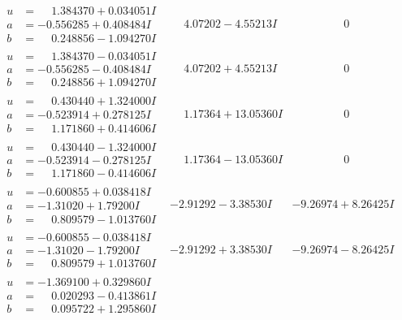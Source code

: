 \documentclass[1p]{elsarticle_modified}
\theoremstyle{definition}
\begin{document}
$$\begin{array}{c|c|c}
\begin{aligned}
u &= \phantom{-}1.384370 + 0.034051 I \\
a &= -0.556285 + 0.408484 I \\
b &= \phantom{-}0.248856 - 1.094270 I\end{aligned}
 & \phantom{-}4.07202 - 4.55213 I & \phantom{-0.000000 } 0 \\ \hline\begin{aligned}
u &= \phantom{-}1.384370 - 0.034051 I \\
a &= -0.556285 - 0.408484 I \\
b &= \phantom{-}0.248856 + 1.094270 I\end{aligned}
 & \phantom{-}4.07202 + 4.55213 I & \phantom{-0.000000 } 0 \\ \hline\begin{aligned}
u &= \phantom{-}0.430440 + 1.324000 I \\
a &= -0.523914 + 0.278125 I \\
b &= \phantom{-}1.171860 + 0.414606 I\end{aligned}
 & \phantom{-}1.17364 + 13.05360 I & \phantom{-0.000000 } 0 \\ \hline\begin{aligned}
u &= \phantom{-}0.430440 - 1.324000 I \\
a &= -0.523914 - 0.278125 I \\
b &= \phantom{-}1.171860 - 0.414606 I\end{aligned}
 & \phantom{-}1.17364 - 13.05360 I & \phantom{-0.000000 } 0 \\ \hline\begin{aligned}
u &= -0.600855 + 0.038418 I \\
a &= -1.31020 + 1.79200 I \\
b &= \phantom{-}0.809579 - 1.013760 I\end{aligned}
 & -2.91292 - 3.38530 I & -9.26974 + 8.26425 I \\ \hline\begin{aligned}
u &= -0.600855 - 0.038418 I \\
a &= -1.31020 - 1.79200 I \\
b &= \phantom{-}0.809579 + 1.013760 I\end{aligned}
 & -2.91292 + 3.38530 I & -9.26974 - 8.26425 I \\ \hline\begin{aligned}
u &= -1.369100 + 0.329860 I \\
a &= \phantom{-}0.020293 - 0.413861 I \\
b &= \phantom{-}0.095722 + 1.295860 I\end{aligned}

\end{array}$$
\end{document}
